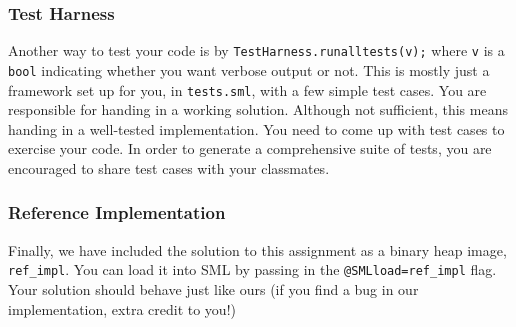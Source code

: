 \documentclass[11pt]{article}
\begin{document}
\small


\normalsize

\subsubsection{Test Harness}

Another way to test your code is by \texttt{TestHarness.runalltests(v);} where \verb|v| is a \verb|bool| indicating whether you want verbose output or not. This is mostly just a framework set up for you, in \texttt{tests.sml}, with a few simple test cases. You are responsible for handing in a working solution. Although not sufficient, this means handing in a well-tested implementation.  You need to come up with test cases to exercise your code.  In order to generate a comprehensive suite of tests, you are encouraged to share test cases with your classmates.

\subsubsection{Reference Implementation}
Finally, we have included the solution to this assignment as a binary heap image, \verb|ref_impl|. You can load it into SML by passing in the \verb|@SMLload=ref_impl| flag. Your solution should behave just like ours (if you find a bug in our implementation, extra credit to you!)

\newpage
\appendix
\end{document}
